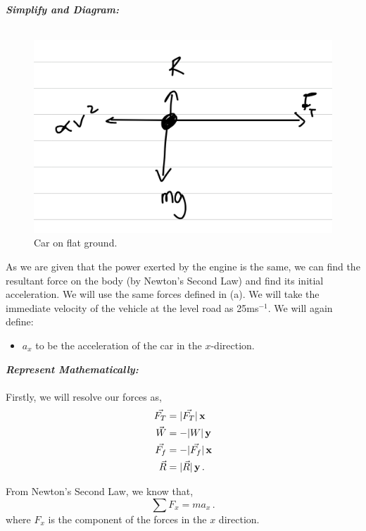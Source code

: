 \begin{subquestions}
\begin{subsubquestions}
\textbf{\textit{Simplify and Diagram:}} \\ \\
\begin{figure}[H]
	\begin{center}
		\includegraphics[scale=0.25]{../2009/figures/2009q5-2}
		\caption{\label{2009:q5:Diagram2} Car on flat ground.}
	\end{center}
\end{figure}	
As we are given that the power exerted by the engine is the same, we can find the resultant force on the body (by Newton's Second Law) and find its initial acceleration. We will use the same forces defined in (a). We will take the immediate velocity of the vehicle at the level road as 25ms$^{-1}$.
We will again define:
\begin{itemize}
	\item $a_x$ to be the acceleration of the car in the $x$-direction.
\end{itemize}



\textbf{\textit{Represent Mathematically:}} \\ \\
Firstly, we will resolve our forces as,
\begin{align}
	\vec{F_T} & = |\vec{F_T}|\,\mathbf{x} \\
	\vec{W} & = -|W|\,\mathbf{y} \\
	\vec{F_f} & = -|\vec{F_f}|\,\mathbf{x} \\
	\vec{R} & = |\vec{R}|\,\mathbf{y} \,.
\end{align}

From Newton's Second Law, we know that,
\begin{equation}
	\sum F_x = ma_x \label{2009:q5:FxEqn2} \,.
\end{equation}
where $F_x$ is the component of the forces in the $x$ direction.





\end{subsubquestions}
\end{subquestions}
